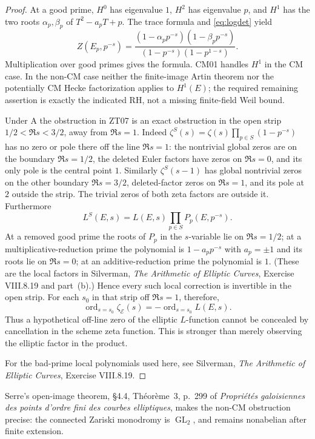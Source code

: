 \documentclass[11pt,a4paper]{article}
\theoremstyle{definition}
\begin{document}
\begin{proof}
At a good prime, $H^0$ has eigenvalue $1$, $H^2$ has eigenvalue $p$,
and $H^1$ has the two roots $\alpha_p,\beta_p$ of
$T^2-a_pT+p$.  The trace formula and \eqref{eq:logdet} yield
\[
 Z(E_p,p^{-s})=
 \frac{(1-\alpha_pp^{-s})(1-\beta_pp^{-s})}
      {(1-p^{-s})(1-p^{1-s})}.
\]
Multiplication over good primes gives the formula.  CM01 handles
$H^1$ in the CM case.  In the non-CM case neither the finite-image
Artin theorem nor the potentially CM Hecke factorization applies
to $H^1(E)$; the required remaining assertion is exactly the
indicated RH, not a missing finite-field Weil bound.

Under A the obstruction in ZT07 is an exact obstruction in the open strip
$1/2<\Re s<3/2$, away from $\Re s=1$.
Indeed $\zeta^S(s)=\zeta(s)\prod_{p\in S}(1-p^{-s})$
has no zero or pole there off the line $\Re s=1$:
the nontrivial global zeros are on the boundary $\Re s=1/2$,
the deleted Euler factors have zeros on $\Re s=0$, and its only pole is
the central point $1$. Similarly $\zeta^S(s-1)$ has global nontrivial
zeros on the other boundary $\Re s=3/2$, deleted-factor zeros on
$\Re s=1$, and its pole at $2$ outside the strip.
The trivial zeros of both zeta factors are outside it.
Furthermore
\[
 L^S(E,s)=L(E,s)\prod_{p\in S}P_p(E,p^{-s}).
\]
At a removed good prime the roots of $P_p$ in the $s$-variable lie on
$\Re s=1/2$; at a multiplicative-reduction prime the polynomial is
$1-a_p p^{-s}$ with $a_p=\pm1$ and its roots lie on $\Re s=0$;
at an additive-reduction prime the polynomial is $1$.
(These are the local factors in Silverman, \emph{The Arithmetic of
Elliptic Curves}, Exercise VIII.8.19 and part~(b).)
Hence every such local correction is invertible in the open strip.
For each $s_0$ in that strip off $\Re s=1$, therefore,
\[
 \operatorname{ord}_{s=s_0}\zeta_{\mathcal E}(s)
       =-\operatorname{ord}_{s=s_0}L(E,s).
\]
Thus a hypothetical off-line zero of the elliptic $L$-function cannot
be concealed by cancellation in the scheme zeta function. This is
stronger than merely observing the elliptic factor in the product.

For the bad-prime local polynomials used here, see Silverman,
\emph{The Arithmetic of Elliptic Curves}, Exercise VIII.8.19.
\end{proof}

Serre's open-image theorem, \S4.4, Th\'eor\`eme~3, p.~299 of \emph{Propri\'et\'es galoisiennes des points d'ordre fini des courbes elliptiques}, makes the non-CM obstruction precise: the connected Zariski monodromy is $\operatorname{GL}_2$, and remains nonabelian after finite extension.
\end{document}
